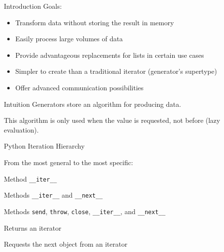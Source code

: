 \begin{frame}{Introduction}
  Goals:
  
  \begin{itemize}[<+->]
  \item Transform data without storing the result in memory
  \item Easily process large volumes of data
  \item Provide advantageous replacements for lists in certain use cases
  \item Simpler to create than a traditional iterator (generator's supertype)
  \item Offer advanced communication possibilities
  \end{itemize}
  \end{frame}
  
  \begin{frame}{Intuition}
  Generators \alert{store an algorithm} for producing data.
  
  This algorithm is \alert{only used when the value is requested}, not before (lazy evaluation).
  \end{frame}
  
  \begin{frame}{Python Iteration Hierarchy}
  
  From the most general to the most specific:
  
  \begin{description}[<+->]
  \item[Iterable] Method \texttt{\_\_iter\_\_}
  \item[Iterator] Methods \texttt{\_\_iter\_\_} and \texttt{\_\_next\_\_}
  \item[Generator] Methods \texttt{send}, \texttt{throw}, \texttt{close}, \texttt{\_\_iter\_\_}, and \texttt{\_\_next\_\_}
  \end{description}
  
  
  \begin{description}[<+->]
  \item[\texttt{\_\_iter\_\_}] Returns an iterator
  \item[\texttt{\_\_next\_\_}] Requests the next object from an iterator
  \end{description}
  
  \end{frame}
  

